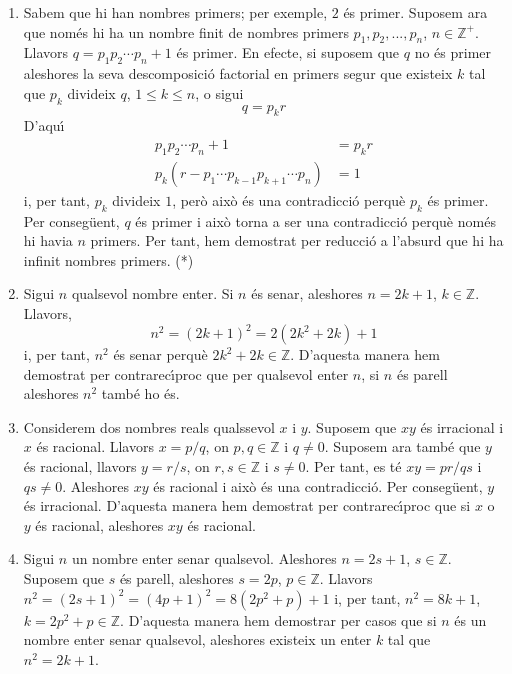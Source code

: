 \begin{enumerate}
\begin{enumerate}
\item Sabem que hi han nombres primers; per exemple, $2$ \'{e}s primer.
Suposem ara que nom\'{e}s hi ha un nombre finit de nombres primers
$p_{1},p_{2},...,p_{n}$, $n\in\mathbb{Z}^{+}$. Llavors $q=p_{1}p_{2}\cdots
p_{n}+1$ \'{e}s primer. En efecte, si suposem que $q$ no \'{e}s primer
aleshores la seva descomposici\'{o} factorial en primers segur que existeix
$k$ tal que $p_{k}$ divideix $q$, $1\leq k\leq n$, o sigui%
\[
q=p_{k}r
\]
D'aqu\'{\i}%
\begin{align*}
p_{1}p_{2}\cdots p_{n}+1 &  =p_{k}r\\
p_{k}\left(  r-p_{1}\cdots p_{k-1}p_{k+1}\cdots p_{n}\right)   &  =1
\end{align*}
i, per tant, $p_{k}$ divideix $1$, per\`{o} aix\`{o} \'{e}s una
contradicci\'{o} perqu\`{e} $p_{k}$ \'{e}s primer. Per conseg\"{u}ent, $q$
\'{e}s primer i aix\`{o} torna a ser una contradicci\'{o} perqu\`{e} nom\'{e}s
hi havia $n$ primers. Per tant, hem demostrat per reducci\'{o} a l'absurd que
hi ha infinit nombres primers. (*)

\item Sigui $n$ qualsevol nombre enter. Si $n$ \'{e}s senar, aleshores
$n=2k+1$, $k\in\mathbb{Z}$. Llavors,%
\[
n^{2}=\left(  2k+1\right)  ^{2}=2\left(  2k^{2}+2k\right)  +1
\]
i, per tant, $n^{2}$ \'{e}s senar perqu\`{e} $2k^{2}+2k\in\mathbb{Z}$.
D'aquesta manera hem demostrat per contrarec\'{\i}proc que per qualsevol enter
$n$, si $n$ \'{e}s parell aleshores $n^{2}$ tamb\'{e} ho \'{e}s.

\item Considerem dos nombres reals qualssevol $x$ i $y$. Suposem que $xy$
\'{e}s irracional i $x$ \'{e}s racional. Llavors $x=p/q$, on $p,q\in
\mathbb{Z}$ i $q\neq0$. Suposem ara tamb\'{e} que $y$ \'{e}s racional, llavors
$y=r/s$, on $r,s\in\mathbb{Z}$ i $s\neq0$. Per tant, es t\'{e} $xy=pr/qs$ i
$qs\neq0$. Aleshores $xy$ \'{e}s racional i aix\`{o} \'{e}s una
contradicci\'{o}. Per conseg\"{u}ent, $y$ \'{e}s irracional. D'aquesta manera
hem demostrat per contrarec\'{\i}proc que si $x$ o $y$ \'{e}s racional,
aleshores $xy$ \'{e}s racional.

\item Sigui $n$ un nombre enter senar qualsevol. Aleshores $n=2s+1$,
$s\in\mathbb{Z}$. Suposem que $s$ \'{e}s parell, aleshores $s=2p$,
$p\in\mathbb{Z}$. Llavors $n^{2}=\left(  2s+1\right)  ^{2}=\left(
4p+1\right)  ^{2}=8\left(  2p^{2}+p\right)  +1$ i, per tant, $n^{2}=8k+1$,
$k=2p^{2}+p\in\mathbb{Z}$. D'aquesta manera hem demostrar per casos que si $n$
\'{e}s un nombre enter senar qualsevol, aleshores existeix un enter $k$ tal
que $n^{2}=2k+1$.
\end{enumerate}


\end{enumerate}
